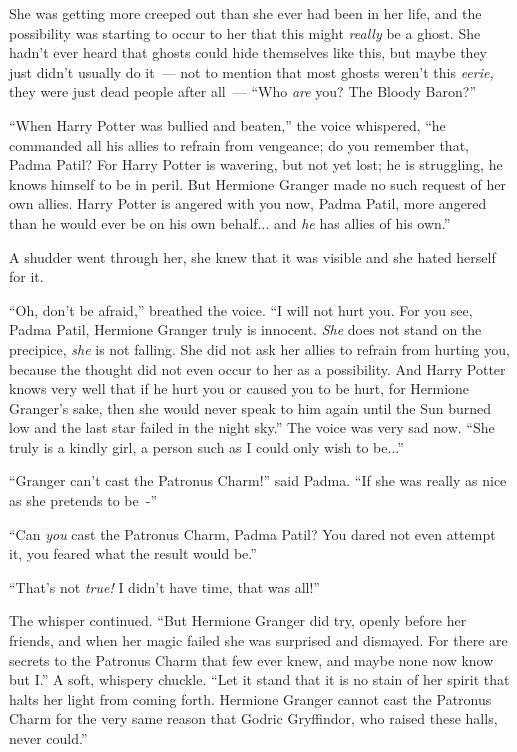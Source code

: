 She was getting more creeped out than she ever had been in her life, and the possibility was starting to occur to her that this might \emph{really} be a ghost. She hadn't ever heard that ghosts could hide themselves like this, but maybe they just didn't usually do it~--- not to mention that most ghosts weren't this \emph{eerie,} they were just dead people after all~--- ``Who \emph{are} you? The Bloody Baron?''

``When Harry Potter was bullied and beaten,'' the voice whispered, ``he commanded all his allies to refrain from vengeance; do you remember that, Padma Patil? For Harry Potter is wavering, but not yet lost; he is struggling, he knows himself to be in peril. But Hermione Granger made no such request of her own allies. Harry Potter is angered with you now, Padma Patil, more angered than he would ever be on his own behalf... and \emph{he} has allies of his own.''

A shudder went through her, she knew that it was visible and she hated herself for it.

``Oh, don't be afraid,'' breathed the voice. ``I will not hurt you. For you see, Padma Patil, Hermione Granger truly is innocent. \emph{She} does not stand on the precipice, \emph{she} is not falling. She did not ask her allies to refrain from hurting you, because the thought did not even occur to her as a possibility. And Harry Potter knows very well that if he hurt you or caused you to be hurt, for Hermione Granger's sake, then she would never speak to him again until the Sun burned low and the last star failed in the night sky.'' The voice was very sad now. ``She truly is a kindly girl, a person such as I could only wish to be...''

``Granger can't cast the Patronus Charm!'' said Padma. ``If she was really as nice as she pretends to be~-''

``Can \emph{you} cast the Patronus Charm, Padma Patil? You dared not even attempt it, you feared what the result would be.''

``That's not \emph{true!} I didn't have time, that was all!''

The whisper continued. ``But Hermione Granger did try, openly before her friends, and when her magic failed she was surprised and dismayed. For there are secrets to the Patronus Charm that few ever knew, and maybe none now know but I.'' A soft, whispery chuckle. ``Let it stand that it is no stain of her spirit that halts her light from coming forth. Hermione Granger cannot cast the Patronus Charm for the very same reason that Godric Gryffindor, who raised these halls, never could.''

